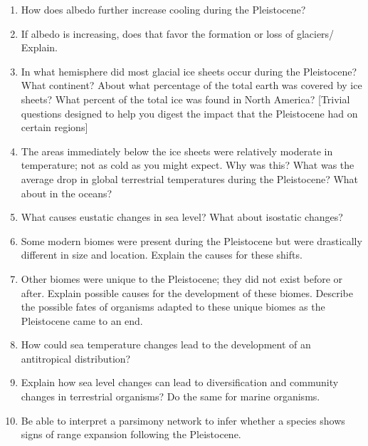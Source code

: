 \documentclass[letterpaper]{tufte-handout}
\begin{document}
\begin{enumerate}
	\item How does albedo further increase cooling during the Pleistocene?

	\item If albedo is increasing, does that favor the formation or loss of glaciers/ Explain.

	\item In what hemisphere did most glacial ice sheets occur during the Pleistocene?  What continent?  About what percentage of the total earth was covered by ice sheets?  What percent of the total ice was found in North America?  [Trivial questions designed to help you digest the impact that the Pleistocene had on certain regions]

	\item The areas immediately below the ice sheets were relatively moderate in temperature; not as cold as you might expect.  Why was this?    What was the average drop in global terrestrial temperatures during the Pleistocene?  What about in the oceans?
	
	\item What causes eustatic changes in sea level?  What about isostatic changes?

	\item Some modern biomes were present during the Pleistocene but were drastically different in size and location.  Explain the causes for these shifts.

	\item Other biomes were unique to the Pleistocene; they did not exist before or after.  Explain possible causes for the development of these biomes.  Describe the possible fates of organisms adapted to these unique biomes as the Pleistocene came to an end.

	\item How could sea temperature changes lead to the development of an antitropical distribution?

	\item Explain how sea level changes can lead to diversification and community changes in terrestrial organisms?  Do the same for marine organisms.  

	\item Be able to interpret a parsimony network to infer whether a species shows signs of range expansion following the Pleistocene.

	
\end{enumerate}
\end{document}
